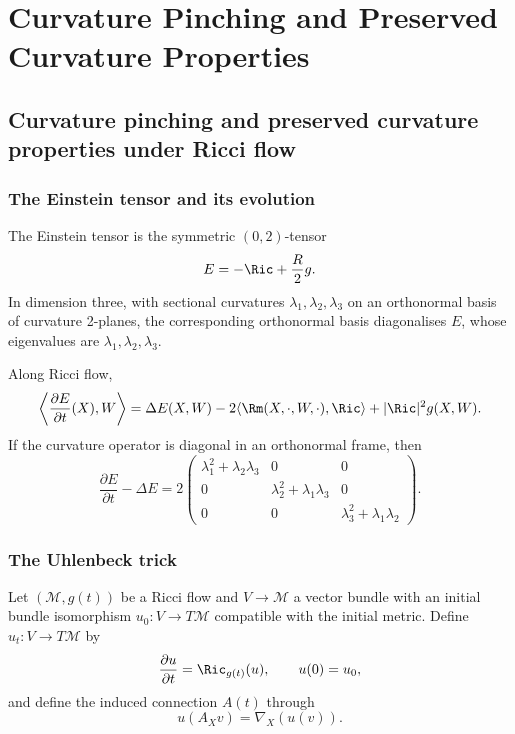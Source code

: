 \chapter{Curvature Pinching and Preserved Curvature Properties}

\section{Curvature pinching and preserved curvature properties under Ricci flow}

\subsection{The Einstein tensor and its evolution}

\begin{definition}
\label{topping-ch9-einstein-tensor}
The Einstein tensor is the symmetric \((0,2)\)-tensor
\[
E=-\Ric+\frac{R}{2}g.
\]
In dimension three, with sectional curvatures
\(\lambda_1,\lambda_2,\lambda_3\) on an orthonormal basis of curvature
2-planes, the corresponding orthonormal basis diagonalises \(E\), whose
eigenvalues are \(\lambda_1,\lambda_2,\lambda_3\).
\end{definition}

\begin{proposition}
\label{topping-ch9-einstein-evolution}
Along Ricci flow,
\[
\left\langle \frac{\partial E}{\partial t}(X),W\right\rangle
=\Delta E(X,W)-2\langle \Rm(X,\cdot,W,\cdot),\Ric\rangle
+|\Ric|^2g(X,W).
\]
If the curvature operator is diagonal in an orthonormal frame, then
\[
\frac{\partial E}{\partial t}-\Delta E
=2\begin{pmatrix}
\lambda_1^2+\lambda_2\lambda_3 & 0 & 0\\
0 & \lambda_2^2+\lambda_1\lambda_3 & 0\\
0 & 0 & \lambda_3^2+\lambda_1\lambda_2
\end{pmatrix}.
\]
\end{proposition}

\subsection{The Uhlenbeck trick}

\begin{definition}
\label{topping-ch9-uhlenbeck-setup}
Let \((\mathcal M,g(t))\) be a Ricci flow and \(V\to\mathcal M\) a vector
bundle with an initial bundle isomorphism \(u_0:V\to T\mathcal M\) compatible
with the initial metric. Define \(u_t:V\to T\mathcal M\) by
\[
\frac{\partial u}{\partial t}=\Ric_{g(t)}(u),\qquad u(0)=u_0,
\]
and define the induced connection \(A(t)\) through
\[
u(A_Xv)=\nabla_X(u(v)).
\]
\end{definition}

